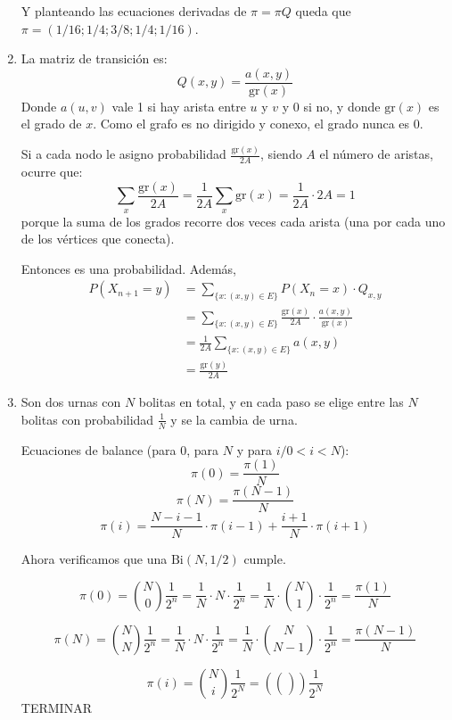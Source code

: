 \begin{enumerate}
		Y planteando las ecuaciones derivadas de $\pi = \pi Q$ queda que $\pi = (1/16; 1/4; 3/8; 1/4; 1/16)$.
		
	\item
		La matriz de transición es:
		$$Q(x,y) = \frac{a(x,y)}{\text{gr}(x)}$$
		Donde $a(u,v)$ vale 1 si hay arista entre $u$ y $v$ y 0 si no, y donde $\text{gr}(x)$ es el grado de $x$.
		Como el grafo es no dirigido y conexo, el grado nunca es 0.
		
		Si a cada nodo le asigno probabilidad $\frac{\text{gr}(x)}{2A}$, siendo $A$ el número de aristas, ocurre que:
		$$\sum_{x}\frac{\text{gr}(x)}{2A} = \frac{1}{2A} \sum_{x}\text{gr}(x) = \frac{1}{2A} \cdot 2A = 1$$
		porque la suma de los grados recorre dos veces cada arista (una por cada uno de los vértices que conecta).
		
		Entonces es una probabilidad.
		Además,
		\begin{align*}
			P(X_{n+1} = y)	& = \sum_{\{x:(x,y) \in E\}}P(X_n = x) \cdot Q_{x,y}									\\
							& = \sum_{\{x:(x,y) \in E\}}\frac{\text{gr}(x)}{2A} \cdot \frac{a(x,y)}{\text{gr}(x)}	\\
							& = \frac{1}{2A}\sum_{\{x:(x,y) \in E\}} a(x,y)											\\
							& = \frac{\text{gr}(y)}{2A}
		\end{align*}
	
	\item
		Son dos urnas con $N$ bolitas en total, y en cada paso se elige entre las $N$ bolitas con probabilidad $\frac{1}{N}$ y se la cambia de urna.
		
		Ecuaciones de balance (para $0$, para $N$ y para $i/0<i<N$):
		$$\pi(0) = \frac{\pi(1)}{N}$$
		$$\pi(N) = \frac{\pi(N-1)}{N}$$
		$$\pi(i) = \frac{N-i-1}{N}\cdot \pi(i-1) + \frac{i+1}{N}\cdot \pi(i+1)$$
		
		Ahora verificamos que una $\text{Bi}(N, 1/2)$ cumple.
		
		$$\pi(0) = \binom{N}{0} \frac{1}{2^n} = \frac{1}{N}\cdot N \cdot \frac{1}{2^n} =
						\frac{1}{N}\cdot \binom{N}{1} \cdot \frac{1}{2^n} = \frac{\pi(1)}{N}$$
						
		$$\pi(N) = \binom{N}{N} \frac{1}{2^n} = \frac{1}{N}\cdot N \cdot \frac{1}{2^n} =
						\frac{1}{N}\cdot \binom{N}{N-1} \cdot \frac{1}{2^n} = \frac{\pi(N-1)}{N}$$
						
		$$\pi(i) = \binom{N}{i} \frac{1}{2^N} = (\binom{}{}) \frac{1}{2^N}$$
		TERMINAR
\end{enumerate}
